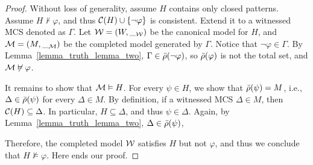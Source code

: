 \documentclass{amsart}
\begin{document}
\completenessB*
\begin{proof}
Without loss of generality, assume $H$ contains only closed patterns.
Assume $H \not\vdash \varphi$,
and thus $\mathcal{C}(H)  \cup \{ \neg \varphi \}$ is consistent.
Extend it to a witnessed MCS denoted as $\Gamma$.
Let $\mathcal{W} = (W, \__{\mathcal{W}})$ be the canonical model for $H$,
and $\mathcal{M} = (M,\__{\mathcal{M}})$ be the completed model generated by $\Gamma$.
Notice that $\neg \varphi \in \Gamma$.
By Lemma~\ref{lemma_truth_lemma_two},
$\Gamma \in \bar{\rho}(\neg \varphi)$,
so $\bar{\rho}(\varphi)$ is not the total set,
and $\mathcal{M} \not\vDash \varphi$.

It remains to show that $\mathcal{M} \vDash H$.
For every $\psi \in H$, we show that $\bar{\rho}(\psi) = M$, i.e.,
$\Delta \in \bar{\rho}(\psi)$ for every $\Delta \in M$.
By definition, if a witnessed MCS $\Delta \in M$,
then $\mathcal{C}(H) \subseteq \Delta$.
In particular, $H \subseteq \Delta$, and thus $\psi \in \Delta$.
Again, by Lemma~\ref{lemma_truth_lemma_two}, 
$\Delta \in \bar{\rho}(\psi)$,

Therefore, the completed model $\mathcal{W}$ satisfies $H$ but not $\varphi$,
and thus we conclude that $H \not\vDash \varphi$.
Here ends our proof.
\end{proof}
\end{document}

